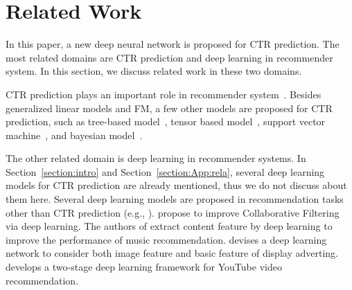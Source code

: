 \section{Related Work}\label{section:related}

In this paper, a new deep neural network is proposed for CTR prediction. The most related domains are CTR prediction and deep learning in recommender system. In this section, we discuss related work in these two domains.

CTR prediction plays an important role in recommender system~\cite{CTR07,ffm,FTRL}. Besides generalized linear models and FM, a few other models are proposed for CTR prediction, such as tree-based model~\cite{facebookgbdt}, tensor based model~\cite{PITFRendleS10}, support vector machine~\cite{Poly2SVM10}, and bayesian model~\cite{bayesCTR10}.




The other related domain is deep learning in recommender systems. In Section~\ref{section:intro} and Section~\ref{section:App:rela}, several deep learning models for CTR prediction are already mentioned, thus we do not discuss about them here. Several deep learning models are proposed in recommendation tasks other than CTR prediction (e.g., \cite{youtube,other-2,other-7,other-6,other-5,wsdm17recurentRS,jointdeepforreviewZhengNY17}). \cite{other-2,other-3,other-4} propose to improve Collaborative Filtering via deep learning. The authors of \cite{other-1,other-7} extract content feature by deep learning to improve the performance of music recommendation. \cite{cnn_image} devises a deep learning network to consider both image feature and basic feature of display adverting. \cite{youtube} develops a two-stage deep learning framework for YouTube video recommendation.



